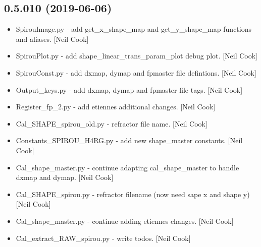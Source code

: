 \documentclass[a4paper,10pt,english]{report}
\begin{document}
\subsection{0.5.010 (2019-06-06)}
\label{\detokenize{misc/changelog:id125}}\begin{itemize}
\item {} 
SpirouImage.py - add get\_x\_shape\_map and get\_y\_shape\_map functions and
aliases. {[}Neil Cook{]}

\item {} 
SpirouPlot.py - add shape\_linear\_trans\_param\_plot debug plot. {[}Neil
Cook{]}

\item {} 
SpirouConst.py - add dxmap, dymap and fpmaster file defintions. {[}Neil
Cook{]}

\item {} 
Output\_keys.py - add dxmap, dymap and fpmaster file tags. {[}Neil Cook{]}

\item {} 
Register\_fp\_2.py - add etiennes additional changes. {[}Neil Cook{]}

\item {} 
Cal\_SHAPE\_spirou\_old.py - refractor file name. {[}Neil Cook{]}

\item {} 
Constants\_SPIROU\_H4RG.py - add new shape\_master constants. {[}Neil Cook{]}

\item {} 
Cal\_shape\_master.py - continue adapting cal\_shape\_master to handle
dxmap and dymap. {[}Neil Cook{]}

\item {} 
Cal\_SHAPE\_spirou.py - refractor filename (now need sape x and shape y)
{[}Neil Cook{]}

\item {} 
Cal\_shape\_master.py - continue adding etiennes changes. {[}Neil Cook{]}

\item {} 
Cal\_extract\_RAW\_spirou.py - write todos. {[}Neil Cook{]}

\end{itemize}
\end{document}
